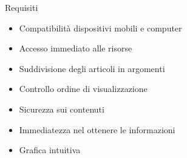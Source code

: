 \documentclass{beamer}
\begin{document}
\begin{frame}{Requisiti}
\begin{itemize}
	\item<1-> Compatibilità dispositivi mobili e computer
	\item<2-> Accesso immediato alle risorse
	\item<3-> Suddivisione degli articoli in argomenti
	\item<4-> Controllo ordine di visualizzazione
	\item<5-> Sicurezza sui contenuti
	\item<6-> Immediatezza nel ottenere le informazioni
	\item<7-> Grafica intuitiva
\end{itemize}
\end{frame}

\end{document}

